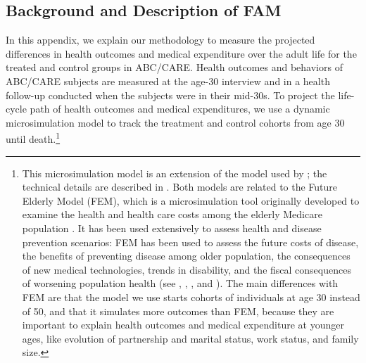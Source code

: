 \subsection{Background and Description of FAM}

\noindent In this appendix, we explain our methodology to measure the projected differences in health outcomes and medical expenditure over the adult life for the treated and control groups in ABC/CARE.
Health outcomes and behaviors of ABC/CARE subjects are measured at the age-30 interview and in a health follow-up conducted when the subjects were in their mid-30s.
To project the life-cycle path of health outcomes and medical expenditures, we use a dynamic microsimulation model to track the treatment and control cohorts from age 30 until death.\footnote{This microsimulation model is an extension of the model used by \citet{Prados_etal_2015_How-Much-Can-Education}; the technical details are described in \citet{Goldman_etal_2015_Future-America-Model}. Both models are related to the Future Elderly Model (FEM), which is a microsimulation tool originally developed to examine the health and health care costs among the elderly Medicare population \citep{Goldman_etal_2004_RAND-Report_Health-Status-Elderly}. It has been used extensively to assess health and disease prevention scenarios: FEM has been used to assess the future costs of disease, the benefits of preventing disease among older population, the consequences of new medical technologies, trends in disability, and the fiscal consequences of worsening population health (see \citet{Goldman_etal_2004_RAND-Report_Health-Status-Elderly}, \citet{Lakdawalla_etal_2004_Health-and-Cost}, \citet{Goldman_etal_2005_HA}, and \citet{Zissimopoulos_etal_2014_Delaying-Alzheimers}). The main differences with FEM are that the model we use starts cohorts of individuals at age 30 instead of 50, and that it simulates more outcomes than FEM, because they are important to explain health outcomes and medical expenditure at younger ages, like evolution of partnership and marital status, work status, and family size.} \\

